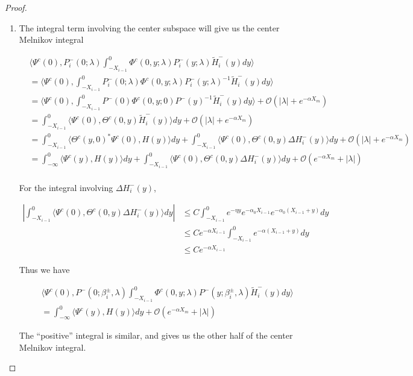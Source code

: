 \documentclass[thesis.tex]{subfiles}
\begin{document}
\begin{lemma}
\begin{proof}
\begin{enumerate}
\item The integral term involving the center subspace will give us the center Melnikov integral

\begin{align*}
&\langle \Psi^c(0), P_i^-(0; \lambda) \int_{-X_{i-1}}^0 \Phi^c(0, y; \lambda) P_i^-(y; \lambda) \tilde{H}_i^-(y) dy \rangle \\
&= \langle \Psi^c(0), \int_{-X_{i-1}}^0 P_i^-(0; \lambda) \Phi^c(0, y; \lambda) P_i^-(y; \lambda)^{-1} \tilde{H}_i^-(y) dy \rangle \\
&= \langle \Psi^c(0), \int_{-X_{i-1}}^0 P^-(0) \Phi^c(0, y; 0) P^-(y)^{-1} \tilde{H}_i^-(y) dy \rangle + \mathcal{O}(|\lambda| + e^{-\alpha X_m}) \\
&= \int_{-X_{i-1}}^0 \langle \Psi^c(0), \Theta^c(0, y) \tilde{H}_i^-(y) \rangle dy + \mathcal{O}(|\lambda| + e^{-\alpha X_m}) \\
&= \int_{-X_{i-1}}^0 \langle \Theta^c(y, 0)^* \Psi^c(0), H(y) \rangle dy + \int_{-X_{i-1}}^0 \langle \Psi^c(0), \Theta^c(0, y) \Delta H_i^-(y) \rangle dy + \mathcal{O}(|\lambda| + e^{-\alpha X_m}) \\
&= \int_{-\infty}^0 \langle \Psi^c(y), H(y) \rangle dy + \int_{-X_{i-1}}^0 \langle \Psi^c(0), \Theta^c(0, y) \Delta H_i^-(y) \rangle dy + \mathcal{O}(e^{-\alpha X_m} + |\lambda|) \\
\end{align*}

For the integral involving $\Delta H_i^-(y)$,

\begin{align*}
\left| \int_{-X_{i-1}}^0 \langle \Psi^c(0), \Theta^c(0, y) \Delta H_i^-(y) \rangle dy \right| &\leq C \int_{-X_{i-1}}^0 e^{-\eta y} e^{-\alpha_0 X_{i-1}} e^{-\alpha_0(X_{i-1} + y)} dy \\
&\leq C e^{-\alpha X_{i-1}} \int_{-X_{i-1}}^0 e^{-\alpha(X_{i-1} + y)} dy \\
&\leq C e^{-\alpha X_{i-1}}
\end{align*}

Thus we have

\begin{align*}
&\langle \Psi^c(0), P^-(0; \beta_i^\pm, \lambda) \int_{-X_{i-1}}^0 \Phi^c(0, y; \lambda) P^-(y; \beta_i^\pm, \lambda) \tilde{H}_i^-(y) dy \rangle \\
&= \int_{-\infty}^0 \langle \Psi^c(y), H(y) \rangle dy + \mathcal{O}(e^{-\alpha X_m} + |\lambda|) 
\end{align*}

The ``positive'' integral is similar, and gives us the other half of the center Melnikov integral.


\end{enumerate}
\end{proof}
\end{lemma}
\end{document}
